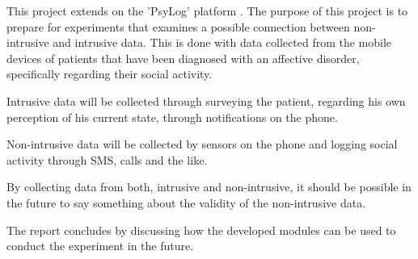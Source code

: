This project extends on the 'PsyLog' platform \cite{faelles}.
The purpose of this project is to prepare for experiments that examines a possible connection between non-intrusive and intrusive data.
This is done with data collected from the mobile devices of patients that have been diagnosed with an affective disorder, specifically regarding their social activity.

Intrusive data will be collected through surveying the patient, regarding his own perception of his current state, through notifications on the phone.

Non-intrusive data will be collected by sensors on the phone and logging social activity through SMS, calls and the like.

By collecting data from both, intrusive and non-intrusive, it should be possible in the future to say something about the validity of the non-intrusive data.

The report concludes by discussing how the developed modules can be used to conduct the experiment in the future.
